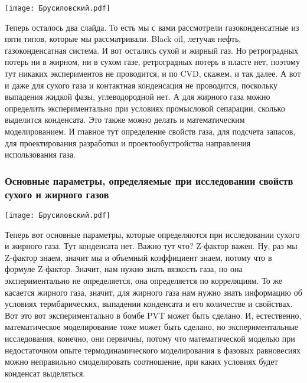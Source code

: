 \documentclass[main.tex]{subfiles}
\begin{document}
\begin{center}
\texttt{[image: Брусиловский.pdf]}
\end{center}

Теперь осталось два слайда.
То есть мы с вами рассмотрели газоконденсатные из пяти типов, которые мы рассматривали.
Black oil, летучая нефть, газоконденсатная система.
И вот остались сухой и жирный газ.
Но ретроградных потерь ни в жирном, ни в сухом газе, ретроградных потерь в пласте нет, поэтому тут никаких экспериментов не проводится, и по CVD, скажем, и так далее.
А вот и даже для сухого газа и контактная конденсация не проводится, поскольку выпадения жидкой фазы, углеводородной нет.
А для жирного газа можно определить экспериментально при условиях промысловой сепарации, сколько выделится конденсата.
Это также можно делать и математическим моделированием.
И главное тут определение свойств газа, для подсчета запасов, для проектирования разработки и проектообустройства направления использования газа.

\subsubsection{Основные параметры, определяемые при исследовании свойств сухого и жирного газов}

\begin{center}
\texttt{[image: Брусиловский.pdf]}
\end{center}

Теперь вот основные параметры, которые определяются при исследовании сухого и жирного газа.
Тут конденсата нет.
Важно тут что?
Z-фактор важен.
Ну, раз мы Z-фактор знаем, значит мы и объемный коэффициент знаем, потому что в формуле Z-фактор.
Значит, нам нужно знать вязкость газа, но она экспериментально не определяется, она определяется по корреляциям.
То же касается жирного газа, значит, для жирного газа нам нужно знать информацию об условиях термбарических, выпадении конденсата и его количестве и свойствах.
Вот это вот экспериментально в бомбе PVT может быть сделано.
И, естественно, математическое моделирование тоже может быть сделано, но экспериментальные исследования, конечно, они первичны, потому что математической моделью при недостаточном опыте термодинамического моделирования в фазовых равновесиях можно неправильно смоделировать соотношение, при каких условиях будет конденсат выделяться.
\end{document}
